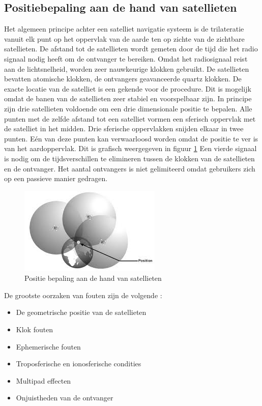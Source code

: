 \subsection{Positiebepaling aan de hand van satellieten}
\label{LPbS}
Het algemeen principe achter een satelliet navigatie systeem is de trilateratie vanuit elk punt op het oppervlak van de aarde ten op zichte van de zichtbare satellieten.  De afstand tot de satellieten wordt gemeten door de tijd die het radio signaal nodig heeft om de ontvanger te bereiken. Omdat het radiosignaal reist aan de lichtsnelheid, worden zeer nauwkeurige klokken gebruikt. De satellieten bevatten atomische klokken, de ontvangers geavanceerde quartz klokken. De exacte locatie van de satelliet is een gekende voor de procedure. Dit is mogelijk omdat de banen van de satellieten zeer stabiel en voorspelbaar zijn. In principe zijn drie satellieten voldoende om een drie dimensionale positie te bepalen. Alle punten met de zelfde afstand tot een satelliet vormen een sferisch oppervlak met de satelliet in het midden. Drie sferische oppervlakken snijden elkaar in twee punten. E\'en van deze punten kan verwaarloosd worden omdat de positie te ver is van het aardoppervlak. Dit is grafisch weergegeven in figuur \ref{imgPbS} Een vierde signaal is nodig om de tijdsverschillen te elimineren tussen de klokken van de satellieten en de ontvanger. Het aantal ontvangers is niet gelimiteerd omdat gebruikers zich op een passieve manier gedragen. 
\begin{figure}[hpb]
	\includegraphics[scale=1.75]{BepalingPositie.jpg}
	\caption{Positie bepaling aan de hand van satellieten \cite{LBibSat}}
	\label{imgPbS}
\end{figure} 
De grootste oorzaken van fouten zijn de volgende \cite{LBibGNSS8}:
\begin{itemize}
	\item De geometrische positie van de satellieten
	\item Klok fouten
	\item Ephemerische fouten
	\item Troposferische en ionosferische condities
	\item Multipad effecten
	\item Onjuistheden van de ontvanger
\end{itemize}

